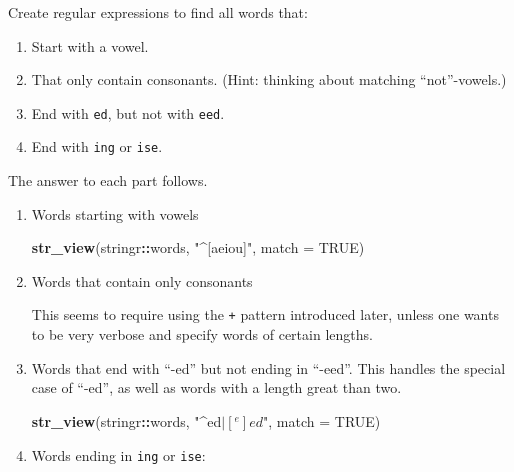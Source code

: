 \documentclass[]{book}
\newenvironment{Shaded}{\begin{snugshade}}{\end{snugshade}}
\newcommand{\DataTypeTok}[1]{\textcolor[rgb]{0.13,0.29,0.53}{#1}}
\newcommand{\KeywordTok}[1]{\textcolor[rgb]{0.13,0.29,0.53}{\textbf{#1}}}
\newcommand{\NormalTok}[1]{#1}
\newcommand{\OperatorTok}[1]{\textcolor[rgb]{0.81,0.36,0.00}{\textbf{#1}}}
\newcommand{\OtherTok}[1]{\textcolor[rgb]{0.56,0.35,0.01}{#1}}
\newcommand{\StringTok}[1]{\textcolor[rgb]{0.31,0.60,0.02}{#1}}
\providecommand{\tightlist}{%
  \setlength{\itemsep}{0pt}\setlength{\parskip}{0pt}}
\theoremstyle{plain}
\theoremstyle{remark}
\begin{document}
Create regular expressions to find all words that:

\begin{enumerate}
\def\labelenumi{\arabic{enumi}.}
\tightlist
\item
  Start with a vowel.
\item
  That only contain consonants. (Hint: thinking about matching ``not''-vowels.)
\item
  End with \texttt{ed}, but not with \texttt{eed}.
\item
  End with \texttt{ing} or \texttt{ise}.
\end{enumerate}

The answer to each part follows.

\begin{enumerate}
\def\labelenumi{\arabic{enumi}.}
\item
  Words starting with vowels

\begin{Shaded}
\begin{Highlighting}[]
\KeywordTok{str_view}\NormalTok{(stringr}\OperatorTok{::}\NormalTok{words, }\StringTok{"^[aeiou]"}\NormalTok{, }\DataTypeTok{match =} \OtherTok{TRUE}\NormalTok{)}
\end{Highlighting}
\end{Shaded}
\item
  Words that contain only consonants

\begin{Shaded}
\end{Shaded}

  This seems to require using the \texttt{+} pattern introduced later, unless one wants to be very verbose and specify words of certain lengths.
\item
  Words that end with ``-ed'' but not ending in ``-eed''. This handles the special case of ``-ed'', as well as words with a length great than two.

\begin{Shaded}
\begin{Highlighting}[]
\KeywordTok{str_view}\NormalTok{(stringr}\OperatorTok{::}\NormalTok{words, }\StringTok{"^ed$|[^e]ed$"}\NormalTok{, }\DataTypeTok{match =} \OtherTok{TRUE}\NormalTok{)}
\end{Highlighting}
\end{Shaded}
\item
  Words ending in \texttt{ing} or \texttt{ise}:

\begin{Shaded}
\end{Shaded}
\end{enumerate}
\end{document}

